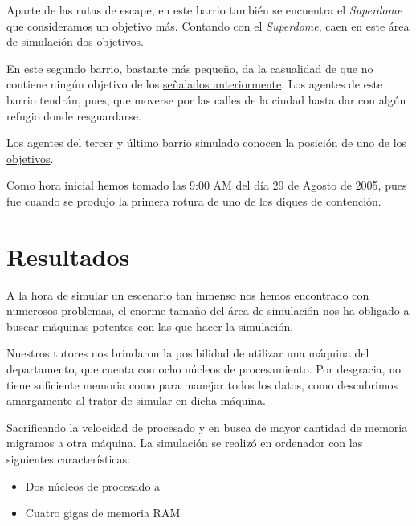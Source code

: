 Aparte de las rutas de escape, en este barrio también se encuentra el {\em
Superdome} que consideramos un objetivo más. Contando con el {\em Superdome},
caen en este área de simulación dos \hyperref[objetivos]{objetivos}.



En este segundo barrio, bastante más pequeño, da la casualidad de que no
contiene ningún objetivo de los \hyperref[objetivos]{señalados anteriormente}.
Los agentes de este barrio tendrán, pues, que moverse por las calles de la
ciudad hasta dar con algún refugio donde resguardarse.



Los agentes del tercer y último barrio simulado conocen la posición de uno de
los \hyperref[objetivos]{objetivos}.



Como hora inicial hemos tomado las 9:00 AM del día 29 de Agosto de 2005, pues
fue cuando se produjo la primera rotura de uno de los diques de
contención\cite{DeLozier}.

\section{Resultados}

A la hora de simular un escenario tan inmenso nos hemos encontrado con
numerosos problemas, el enorme tamaño del área de simulación nos ha obligado a
buscar máquinas potentes con las que hacer la simulación.

Nuestros tutores nos brindaron la posibilidad de utilizar una máquina del
departamento, que cuenta con ocho núcleos de procesamiento. Por desgracia, no
tiene suficiente memoria como para manejar todos los datos, como descubrimos
amargamente al tratar de simular en dicha máquina.

Sacrificando la velocidad de procesado y en busca de mayor cantidad de memoria
migramos a otra máquina. La simulación se realizó en ordenador con las
siguientes características:

\begin{itemize}
 \item Dos núcleos de procesado a %
 \item Cuatro gigas de memoria RAM
\end{itemize}

